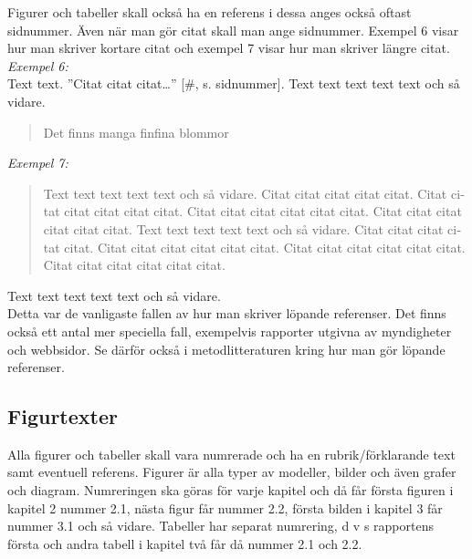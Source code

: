\documentclass[a4paper,12pt]{article} %
\begin{document}
Figurer och tabeller skall också ha en referens i dessa anges också oftast sidnummer. Även när man gör citat skall man ange sidnummer. Exempel 6 visar hur man skriver kortare citat och exempel 7 visar hur man skriver längre citat.\\

{\em Exempel 6:}\\
Text text. ”Citat citat citat…”  [\#, s. sidnummer]. Text text text text text och så vidare.

\begin{quotation}
Det finns manga finfina blommor \cite[s. 23]{Creswell2014} \\
\end{quotation}

{\em Exempel 7:}
\hyphenblockcquote{swedish}[s. 1]{Creswell2014}{
Text text text text text och så vidare. Citat citat citat citat citat. Citat citat citat citat citat citat. Citat citat citat citat citat citat. Citat citat citat citat citat citat. Text text text text text och så vidare. Citat citat citat citat citat. Citat citat citat citat citat citat. Citat citat citat citat citat citat. Citat citat citat citat citat citat.}
Text text text text text och så vidare. \\

Detta var de vanligaste fallen av hur man skriver löpande referenser. Det finns också ett antal mer speciella fall, exempelvis rapporter utgivna av myndigheter och webbsidor. Se därför också i metodlitteraturen kring hur man gör löpande referenser.

\subsection{Figurtexter}
Alla figurer och tabeller skall vara numrerade och ha en rubrik/förklarande text samt eventuell referens. Figurer är alla typer av modeller, bilder och även grafer och diagram. Numreringen ska göras för varje kapitel och då får första figuren i kapitel 2 nummer 2.1, nästa figur får nummer 2.2, första bilden i kapitel 3 får nummer 3.1 och så vidare. Tabeller har separat numrering, d v s rapportens första och andra tabell i kapitel två får då nummer 2.1 och 2.2.
\end{document}
